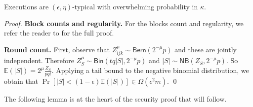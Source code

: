 \begin{theorem}[Typicality]\label{thm.typicality}
Executions are $(\epsilon, \eta)$-typical with overwhelming
probability in $\kappa$.
\end{theorem}
\begin{proof}

    \textbf{Block counts and regularity. }
    For the blocks count and regularity, we refer the reader to \cite{backbone}
    for the full proof.

    \textbf{Round count. }
    First, observe that $Z_{ijk}^\mu \sim \textsf{Bern}(2^{-\mu}p)$ and these
    are jointly independent. Therefore $Z_S^\mu \sim \textsf{Bin}(tq|S|,
    2^{-\mu}p)$ and $|S| \sim \textsf{NB}(Z_S, 2^{-\mu}p)$. So $\mathbb{E}(|S|) =
    2^\mu\frac{Z_S}{pqt}$. Applying a tail bound to the negative binomial
    distribution, we obtain that $\Pr[|S| < (1 - \epsilon)\mathbb{E}(|S|)] \in
    \Omega(\epsilon^2 m)$. \qed
\end{proof}

The following lemma is at the heart of the security proof that will follow.


